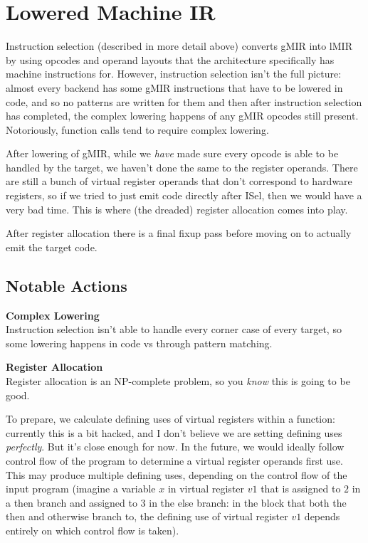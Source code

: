 \documentclass[12pt]{article}
\begin{document}
\section{Lowered Machine IR}
\label{sec:lowered-machine-ir}

Instruction selection (described in more detail above) converts gMIR into lMIR by using opcodes and operand layouts that the architecture specifically has machine instructions for. However, instruction selection isn't the full picture: almost every backend has some gMIR instructions that have to be lowered in code, and so no patterns are written for them and then after instruction selection has completed, the complex lowering happens of any gMIR opcodes still present. Notoriously, function calls tend to require complex lowering.

After lowering of gMIR, while we \emph{have} made sure every opcode is able to be handled by the target, we haven't done the same to the register operands. There are still a bunch of virtual register operands that don't correspond to hardware registers, so if we tried to just emit code directly after ISel, then we would have a very bad time. This is where (the dreaded) register allocation comes into play.

After register allocation there is a final fixup pass before moving on to actually emit the target code.


\subsection{Notable Actions}
\label{subsec:lowered-machine-ir:notable-actions}

\noindent\textbf{Complex Lowering}\\
\indent Instruction selection isn't able to handle every corner case of every target, so some lowering happens in code vs through pattern matching.

\noindent\textbf{Register Allocation}\\
\indent Register allocation is an NP-complete problem, so you \emph{know} this is going to be good.

To prepare, we calculate defining uses of virtual registers within a function: currently this is a bit hacked, and I don't believe we are setting defining uses \emph{perfectly}. But it's close enough for now. In the future, we would ideally follow control flow of the program to determine a virtual register operands first use. This may produce multiple defining uses, depending on the control flow of the input program (imagine a variable $x$ in virtual register $v1$ that is assigned to $2$ in a then branch and assigned to $3$ in the else branch: in the block that both the then and otherwise branch to, the defining use of virtual register $v1$ depends entirely on which control flow is taken).
\end{document}

